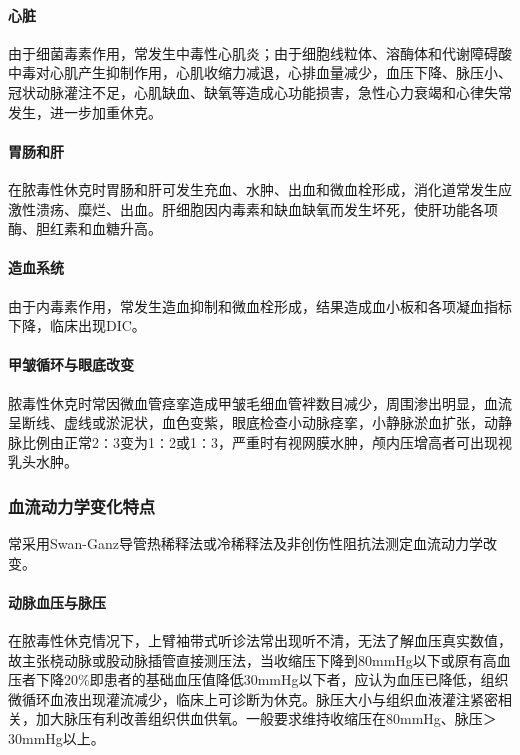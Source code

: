 \paragraph{心脏}

由于细菌毒素作用，常发生中毒性心肌炎；由于细胞线粒体、溶酶体和代谢障碍酸中毒对心肌产生抑制作用，心肌收缩力减退，心排血量减少，血压下降、脉压小、冠状动脉灌注不足，心肌缺血、缺氧等造成心功能损害，急性心力衰竭和心律失常发生，进一步加重休克。

\paragraph{胃肠和肝}

在脓毒性休克时胃肠和肝可发生充血、水肿、出血和微血栓形成，消化道常发生应激性溃疡、糜烂、出血。肝细胞因内毒素和缺血缺氧而发生坏死，使肝功能各项酶、胆红素和血糖升高。

\paragraph{造血系统}

由于内毒素作用，常发生造血抑制和微血栓形成，结果造成血小板和各项凝血指标下降，临床出现DIC。

\paragraph{甲皱循环与眼底改变}

脓毒性休克时常因微血管痉挛造成甲皱毛细血管袢数目减少，周围渗出明显，血流呈断线、虚线或淤泥状，血色变紫，眼底检查小动脉痉挛，小静脉淤血扩张，动静脉比例由正常2∶3变为1∶2或1∶3，严重时有视网膜水肿，颅内压增高者可出现视乳头水肿。

\subsubsection{血流动力学变化特点}

常采用Swan-Ganz导管热稀释法或冷稀释法及非创伤性阻抗法测定血流动力学改变。

\paragraph{动脉血压与脉压}

在脓毒性休克情况下，上臂袖带式听诊法常出现听不清，无法了解血压真实数值，故主张桡动脉或股动脉插管直接测压法，当收缩压下降到80mmHg以下或原有高血压者下降20\%即患者的基础血压值降低30mmHg以下者，应认为血压已降低，组织微循环血液出现灌流减少，临床上可诊断为休克。脉压大小与组织血液灌注紧密相关，加大脉压有利改善组织供血供氧。一般要求维持收缩压在80mmHg、脉压＞
30mmHg以上。

